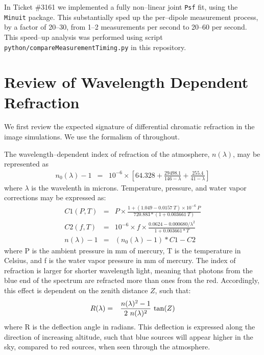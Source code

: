 \documentclass[prd, nofootinbib, floatfix, 11pt, tightenlines, times]{article}
\begin{document}
In Ticket \#3161 we implemented a fully non--linear joint {\tt Psf}
fit, using the {\tt Minuit} package.  This substantially sped up the
per--dipole measurement process, by a factor of 20--30, from 1--2
measurements per second to 20--60 per second.  This speed--up analysis
was performed using script {\tt python/compareMeasurementTiming.py} in
this repository.

\section{Review of Wavelength Dependent Refraction \label{sec:theory}}

We first review the expected signature of differential chromatic
refraction in the image simulations.  We use the formalism of
\cite{1982PASP...94..715F} throughout.

The wavelength--dependent index of refraction of the atmosphere,
$n(\lambda)$, may be represented as
\begin{eqnarray}
n_0(\lambda) - 1 & = & 10^{-6} \times \left[ 64.328 + \frac{29498.1}{146 - \lambda} + \frac{255.4}{41 - \lambda} \right]
\end{eqnarray}
where $\lambda$ is the wavelenth in microns.  Temperature, pressure,
and water vapor corrections may be expressed as:
\begin{eqnarray}
C1(P,T) & = & P \times \frac{1 + (1.049 - 0.0157~T) \times 10^{-6}~P}{720.883 * (1 + 0.003661~T)} \\
C2(f,T) & = & 10^{-6} \times f \times \frac{0.0624 - 0.000680/\lambda^2}{1 + 0.003661 * T} \\
n(\lambda) - 1 & = & (n_0(\lambda) - 1) * C1 - C2 
\end{eqnarray}
where P is the ambient pressure in mm of mercury, T is the temperature
in Celsius, and f is the water vapor pressure in mm of mercury.  The
index of refraction is larger for shorter wavelength light, meaning
that photons from the blue end of the spectrum are refracted more than
ones from the red.  Accordingly, this effect is dependent on the
zenith distance $Z$, such that:
\begin{eqnarray}
R(\lambda) & = & \frac{n(\lambda)^2 - 1}{2~n(\lambda)^2}~{\rm tan}(Z)
\end{eqnarray}
where R is the deflection angle in radians.  This deflection is
expressed along the direction of increasing altitude, such that blue
sources will appear higher in the sky, compared to red sources, when
seen through the atmosphere.
\end{document}
